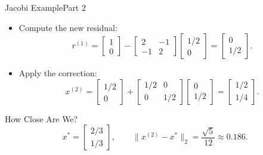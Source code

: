 \documentclass[10pt]{beamer}
\begin{document}
\begin{frame}{Jacobi Example}{Part 2}

\begin{itemize}
    \item Compute the new residual:
    \[
    r^{(1)}
    =
    \begin{bmatrix}1\\0\end{bmatrix}
    -
    \begin{bmatrix}2&-1\\-1&2\end{bmatrix}
    \begin{bmatrix}1/2\\0\end{bmatrix}
    =
    \begin{bmatrix}0\\1/2\end{bmatrix}.
    \]

    \item Apply the correction:
    \[
    x^{(2)}
    =
    \begin{bmatrix}1/2\\0\end{bmatrix}
    +
    \begin{bmatrix}1/2&0\\0&1/2\end{bmatrix}
    \begin{bmatrix}0\\1/2\end{bmatrix}
    =
    \begin{bmatrix}1/2\\1/4\end{bmatrix}.
    \]
\end{itemize}

\begin{block}{How Close Are We?}
\[
    x^*=\begin{bmatrix}2/3\\1/3\end{bmatrix},
    \qquad
    \|x^{(2)}-x^*\|_2
    =\frac{\sqrt{5}}{12}
    \approx0.186.
\]
\end{block}

\end{frame}
\end{document}
